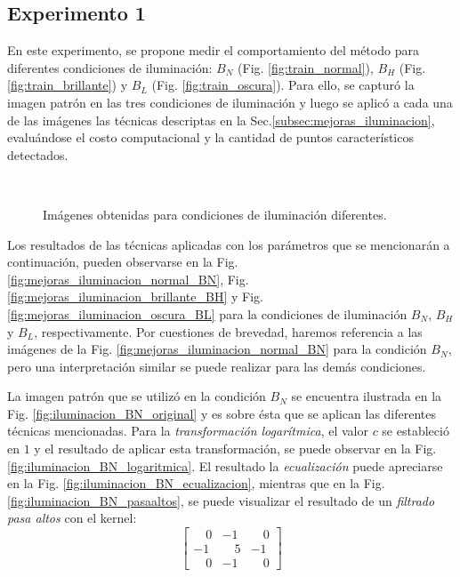 \subsection{Experimento 1}
\label{subsec:paraqumetros_utilizados}
En este experimento, se propone medir el comportamiento del método para diferentes condiciones de iluminación: $B_{N}$ (Fig. \ref{fig:train_normal}), $B_{H}$ (Fig. \ref{fig:train_brillante}) y $B_{L}$ (Fig. \ref{fig:train_oscura}). Para ello, se capturó la imagen patrón en las tres condiciones de iluminación y luego se aplicó a cada una de las imágenes las técnicas descriptas en la Sec.\ref{subsec:mejoras_iluminacion}, evaluándose el costo computacional y la cantidad de puntos característicos detectados. 
\begin{figure}[H]
\centering
{}
\\
\caption[Imágenes obtenidas para condiciones de iluminación diferentes]{Imágenes obtenidas para condiciones de iluminación diferentes.}
\label{fig:prueba_iluminacion_realce_detalles_2_imagenes}
\end{figure}
 
Los resultados de las técnicas aplicadas con los parámetros que se mencionarán a continuación, pueden observarse en la Fig. \ref{fig:mejoras_iluminacion_normal_BN}, Fig. \ref{fig:mejoras_iluminacion_brillante_BH} y Fig. \ref{fig:mejoras_iluminacion_oscura_BL} para la condiciones de iluminación $B_{N}$, $B_{H}$ y $B_{L}$, respectivamente. Por cuestiones de brevedad, haremos referencia a las imágenes de la Fig. \ref{fig:mejoras_iluminacion_normal_BN} para la condición $B_{N}$, pero una interpretación similar se puede realizar para las demás condiciones. 

La imagen patrón que se utilizó en la condición $B_{N}$ se encuentra ilustrada en la Fig. \ref{fig:iluminacion_BN_original} y es sobre ésta que se aplican las diferentes técnicas mencionadas. Para la \textit{transformación logarítmica}, el valor $c$ se estableció en $1$ y el resultado de aplicar esta transformación, se puede observar en la Fig. \ref{fig:iluminacion_BN_logaritmica}. El resultado la \textit{ecualización} puede apreciarse en la Fig. \ref{fig:iluminacion_BN_ecualizacion}, mientras que en la Fig. \ref{fig:iluminacion_BN_pasaaltos}, se puede visualizar el resultado de un \textit{filtrado pasa altos} con el kernel:
\begin{equation}
\label{eq:kernel_pasaaltos}
\begin{bmatrix}
\quad0 & -1 & \quad0\\
-1 & \quad5 & -1\\
\quad0 & -1 & \quad0
\end{bmatrix}
\end{equation}

